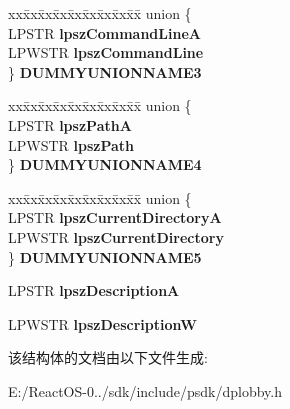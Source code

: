 \begin{DoxyCompactItemize}
\begin{tabbing}
\end{tabbing}\item 
\mbox{\label{structtag_d_p_a_p_p_l_i_c_a_t_i_o_n_d_e_s_c_aee10cc8472935e9b7e6dbbeba46749d7}} 
\begin{tabbing}
xx\=xx\=xx\=xx\=xx\=xx\=xx\=xx\=xx\=\kill
union \{\\
\>LPSTR {\bfseries lpszCommandLineA}\\
\>LPWSTR {\bfseries lpszCommandLine}\\
\} {\bfseries DUMMYUNIONNAME3}\\

\end{tabbing}\item 
\mbox{\label{structtag_d_p_a_p_p_l_i_c_a_t_i_o_n_d_e_s_c_ad09d77c76f4d68a74cb6031d7f3901b3}} 
\begin{tabbing}
xx\=xx\=xx\=xx\=xx\=xx\=xx\=xx\=xx\=\kill
union \{\\
\>LPSTR {\bfseries lpszPathA}\\
\>LPWSTR {\bfseries lpszPath}\\
\} {\bfseries DUMMYUNIONNAME4}\\

\end{tabbing}\item 
\mbox{\label{structtag_d_p_a_p_p_l_i_c_a_t_i_o_n_d_e_s_c_a0cf1358ea271a1ff32f4f1539e36c61f}} 
\begin{tabbing}
xx\=xx\=xx\=xx\=xx\=xx\=xx\=xx\=xx\=\kill
union \{\\
\>LPSTR {\bfseries lpszCurrentDirectoryA}\\
\>LPWSTR {\bfseries lpszCurrentDirectory}\\
\} {\bfseries DUMMYUNIONNAME5}\\

\end{tabbing}\item 
\mbox{\label{structtag_d_p_a_p_p_l_i_c_a_t_i_o_n_d_e_s_c_a502748af691e8cdeb4145043255614eb}} 
L\+P\+S\+TR {\bfseries lpsz\+DescriptionA}
\item 
\mbox{\label{structtag_d_p_a_p_p_l_i_c_a_t_i_o_n_d_e_s_c_aa88339ec4c0c70ab7c0f2336f43d3f84}} 
L\+P\+W\+S\+TR {\bfseries lpsz\+DescriptionW}
\end{DoxyCompactItemize}


该结构体的文档由以下文件生成\+:\begin{DoxyCompactItemize}
\item 
E\+:/\+React\+O\+S-\/0../sdk/include/psdk/dplobby.\+h\end{DoxyCompactItemize}
